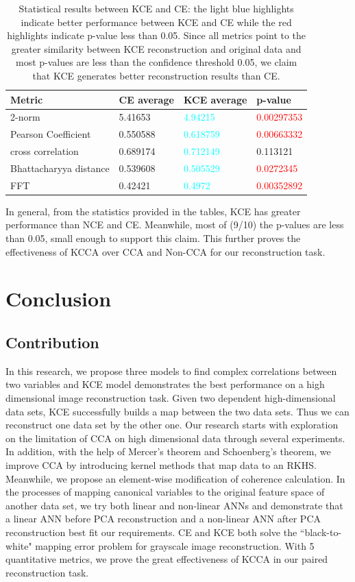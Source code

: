\documentclass[12pt]{report} %
\begin{document}
\begin{table}[H]
	\centering
	\begin{tabular}{m{5cm}m{3cm}m{3cm}m{3cm}}
		\toprule
		Metric & CE average & KCE average & p-value \\
		\midrule
		2-norm & 5.41653 & \textcolor{cyan}{4.94215} & \textcolor{red}{0.00297353} \\
		Pearson Coefficient & 0.550588 & \textcolor{cyan}{0.618759} & \textcolor{red}{0.00663332} \\
		cross correlation & 0.689174 & \textcolor{cyan}{0.712149} & 0.113121 \\
		Bhattacharyya distance & 0.539608 & \textcolor{cyan}{0.505529} & \textcolor{red}{0.0272345} \\
		FFT & 0.42421 & \textcolor{cyan}{0.4972} & \textcolor{red}{0.00352892} \\
		\bottomrule
	\end{tabular}
	\caption{Statistical results between KCE and CE: the light blue highlights indicate better performance between KCE and CE while the red highlights indicate p-value less than 0.05. Since all metrics point to the greater similarity between KCE reconstruction and original data and most p-values are less than the confidence threshold 0.05, we claim that KCE generates better reconstruction results than CE.}
\end{table}


In general, from the statistics provided in the tables, KCE has greater performance than NCE and CE. Meanwhile, most of (9/10) the p-values are less than 0.05, small enough to support this claim. This further proves the effectiveness of KCCA over CCA and Non-CCA for our reconstruction task. 

\chapter{Conclusion}
\section{Contribution}
In this research, we propose three models to find complex correlations between two variables and KCE model demonstrates the best performance on a high dimensional image reconstruction task. Given two dependent high-dimensional data sets, KCE successfully builds a map between the two data sets. Thus we can reconstruct one data set by the other one. Our research starts with exploration on the limitation of CCA on high dimensional data through several experiments. In addition, with the help of Mercer's theorem and Schoenberg's theorem, we improve CCA by introducing kernel methods that map data to an RKHS. Meanwhile, we propose an element-wise modification of coherence calculation. In the processes of mapping canonical variables to the original feature space of another data set, we try both linear and non-linear ANNs and demonstrate that a linear ANN before PCA reconstruction and a non-linear ANN after PCA reconstruction best fit our requirements. CE and KCE both solve the ``black-to-white" mapping error problem for grayscale image reconstruction. With 5 quantitative metrics, we prove the great effectiveness of KCCA in our paired reconstruction task.
\end{document}
